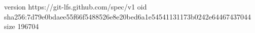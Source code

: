 version https://git-lfs.github.com/spec/v1
oid sha256:7d79e0bdaee55f66f5488526e8e20bed6a1e54541131173b0242e64467437044
size 196704
